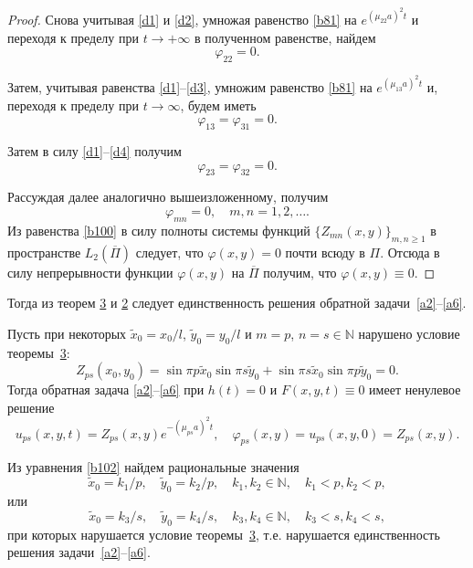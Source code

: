 \begin{proof}
Снова учитывая \eqref{d1} и \eqref{d2},  умножая равенство \eqref{b81} на $e^{(\mu_{22} a)^2 t}$ и  переходя к пределу при $t \rightarrow +\infty$ в полученном равенстве, найдем
\begin{equation}
\label{d3}\varphi_{22}=0.
\end{equation}

Затем, учитывая равенства \eqref{d1}--\eqref{d3}, 
умножим равенство \eqref{b81} на $e^{(\mu_{13} a)^2 t}$ и, переходя к пределу при $t\rightarrow \infty$, будем иметь
\begin{equation}
\label{d4}\varphi_{13}=\varphi_{31}=0.
\end{equation}

Затем в силу \eqref{d1}--\eqref{d4} получим
$$
\varphi_{23}=\varphi_{32}=0.
$$

Рассуждая далее аналогично вышеизложенному, получим
\begin{equation}
\label{b100}
\varphi_{mn}=0,\quad  m,n=1, 2,\ldots .
\end{equation}
Из равенства \eqref{b100} в силу полноты системы функций $\{Z_{mn}(x,y)\}_{m,n\geqslant 1}$ в пространстве $L_2(\overline{\Pi})$ следует, что $\varphi(x,y)=0$ почти всюду в $\Pi$. 
Отсюда в силу непрерывности функции $\varphi(x,y)$ на $\overline{\Pi}$ получим, что $\varphi(x,y)\equiv0.$ 
\end{proof}

\smallskip

Тогда из теорем \hyperlink{zay:th3}{3}  и \hyperlink{zay:th2}{2}  следует единственность решения обратной задачи~\eqref{a2}--\eqref{a6}.

\smallskip

Пусть при некоторых $\widetilde{x}_0={x_0}/{l}$, $\widetilde{y}_0={y_0}/{l}$ и $m=p$,  $ n=s\in \mathbb{N}$ нарушено условие теоремы~\hyperlink{zay:th3}{3}:
\begin{equation}
\label{b102}Z_{ps}(x_0,y_0)=\sin\pi p\widetilde{x}_0\sin\pi s\widetilde{y}_0+\sin\pi s\widetilde{x}_0\sin\pi p\widetilde{y}_0=0.\end{equation}
Тогда обратная задача \eqref{a2}--\eqref{a6} при $h(t)=0$ и $F(x,y,t)\equiv 0$ имеет ненулевое решение
\begin{equation}
\label{b112}
u_{ps}(x,y,t)=Z_{ps}(x,y)e^{-(\mu_{ps} a)^2t},\quad  \varphi_{ps}(x,y)=u_{ps}(x,y,0)=Z_{ps}(x,y).
\end{equation}

Из уравнения \eqref{b102} найдем рациональные значения
\begin{equation}
\label{b122}
\widetilde{x}_0={k_1}/{p},\quad   \widetilde{y}_0={k_2}/{p},\quad  k_1 , k_2\in \mathbb{N},\quad  k_1<p, k_2<p,
\end{equation}
или
\begin{equation}
\label{b14}
\widetilde{x}_0={k_3}/{s},\quad   \widetilde{y}_0={k_4}/{s}, \quad  k_3, k_4\in \mathbb{N},\quad  k_3<s, k_4<s,
\end{equation}
при которых нарушается условие теоремы~\hyperlink{zay:th3}{3}, т.е. нарушается единственность решения задачи~\eqref{a2}--\eqref{a6}.

